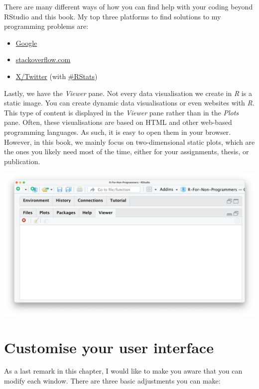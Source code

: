 \documentclass[
  letterpaper,
  DIV=11,
  numbers=noendperiod]{scrreprt}
\begin{document}
There are many different ways of how you can find help with your coding
beyond RStudio and this book. My top three platforms to find solutions
to my programming problems are:

\begin{itemize}
\item
  \href{https://www.google.com}{Google}
\item
  \href{https://stackoverflow.com}{stackoverflow.com}
\item
  \href{https://twitter.com/home}{X/Twitter} (with
  \href{https://twitter.com/hashtag/rstats}{\#RStats})
\end{itemize}

Lastly, we have the \emph{Viewer} pane. Not every data visualisation we
create in \emph{R} is a static image. You can create dynamic data
visualisations or even websites with \emph{R}. This type of content is
displayed in the \emph{Viewer} pane rather than in the \emph{Plots}
pane. Often, these visualisations are based on HTML and other web-based
programming languages. As such, it is easy to open them in your browser.
However, in this book, we mainly focus on two-dimensional static plots,
which are the ones you likely need most of the time, either for your
assignments, thesis, or publication.

\includegraphics{images/chapter_04_img/05_files_plots_etc/05_rstudio_viewer.png}

\section{Customise your user
interface}\label{sec-customise-your-user-interface}

As a last remark in this chapter, I would like to make you aware that
you can modify each window. There are three basic adjustments you can
make:
\end{document}
